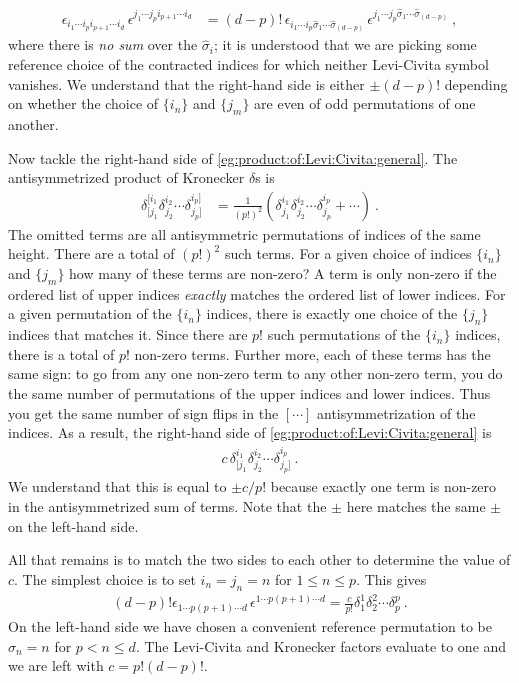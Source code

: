 \begin{subappendices}
\begin{align}
    \epsilon_{i_1\cdots i_p i_{p+1}\cdots i_d}\,
    \epsilon^{j_1\cdots j_p i_{p+1}\cdots i_d}
    &= 
    (d-p)!\,
    \epsilon_{i_1\cdots i_p \hat\sigma_1\cdots \hat\sigma_{(d-p)}}\,
    \epsilon^{j_1\cdots j_p \hat\sigma_1\cdots \hat\sigma_{(d-p)}}
     \ ,
\end{align}
where there is \emph{no sum} over the $\hat\sigma_i$; it is understood that we are picking some reference choice of the contracted indices for which neither Levi-Civita symbol vanishes. We understand that the right-hand side is either $\pm (d-p)!$ depending on whether the choice of $\{i_n\}$ and $\{j_m\}$ are even of odd permutations of one another. 

Now tackle the right-hand side of \eqref{eg:product:of:Levi:Civita:general}. The antisymmetrized product of Kronecker $\delta$s is
\begin{align}
    \delta^{[i_1}_{[j_1}\delta^{i_2}_{j_2} \cdots \delta^{i_p]}_{j_p]}
    &=
    \frac{1}{(p!)^2}
    \left( 
    \delta^{i_1}_{j_1}\delta^{i_2}_{j_2} \cdots \delta^{i_p}_{j_p}
    + \cdots
    \right) \ .
\end{align}
The omitted terms are all antisymmetric permutations of indices of the same height. There are a total of $(p!)^2$ such terms.  For a given choice of indices $\{i_n\}$ and $\{j_m\}$ how many of these terms are non-zero? A term is only non-zero if the ordered list of upper indices \emph{exactly} matches the ordered list of lower indices. For a given permutation of the $\{i_n\}$ indices, there is exactly one choice of the $\{j_n\}$ indices that matches it. Since there are $p!$ such permutations of the $\{i_n\}$ indices, there is a total of $p!$ non-zero terms. Further more, each of these terms has the same sign: to go from any one non-zero term to any other non-zero term, you do the same number of permutations of the upper indices and lower indices. Thus you get the same number of sign flips in the $[\cdots]$ antisymmetrization of the indices. As a result, the right-hand side of \eqref{eg:product:of:Levi:Civita:general} is
\begin{align}
    c\,
    \delta^{i_1}_{[j_1}\delta^{i_2}_{j_2} \cdots \delta^{i_p}_{j_p]} \ .
\end{align}
We understand that this is equal to $\pm c/p!$ because exactly one term is non-zero in the antisymmetrized sum of terms. Note that the $\pm$ here matches the same $\pm$ on the left-hand side.

All that remains is to match the two sides to each other to determine the value of $c$. The simplest choice is to set $i_n = j_n = n$ for $1\leq n \leq p$. This gives
\begin{align}
    (d-p)!
    \epsilon_{1\cdots p (p+1)\cdots d}\,
    \epsilon^{1\cdots p (p+1)\cdots d}
    =
    \frac{c}{p!}
    \delta^{1}_{1}\delta^{2}_{2} \cdots \delta^{p}_{p} \ .
\end{align}
On the left-hand side we have chosen a convenient reference permutation to be $\hat \sigma_n = n$ for $p < n \leq d$. The Levi-Civita and Kronecker factors evaluate to one and we are left with $c= p! (d-p)!$. 





\end{subappendices}
